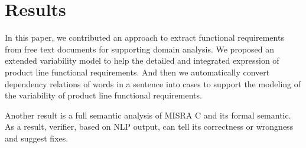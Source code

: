 \section{Results}
\begin{minipage}{\linewidth}
	\begin{multicols*}{2}
		In this paper, we contributed an approach to extract functional requirements from free text documents for supporting domain analysis. We proposed an extended variability model to help the detailed and integrated expression of product line functional requirements. And then we automatically convert dependency relations of words in a sentence into cases to support the modeling of the variability of product line functional requirements.

		Another result is a full semantic analysis of \gls{MISRA} C and its formal semantic. 
		As a result, verifier, based on \gls{NLP} output, can tell its correctness or wrongness and suggest fixes. 
	\end{multicols*}
\end{minipage}
